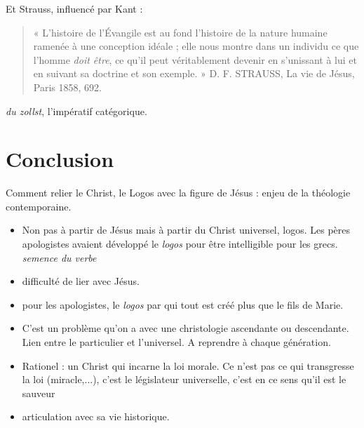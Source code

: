 Et Strauss, influencé par Kant : 
\begin{quote}
« L’histoire de l’Évangile est au fond l’histoire de la nature humaine ramenée à une
conception idéale ; elle nous montre dans un individu ce que l’homme \textit{doit être}, ce qu’il peut
véritablement devenir en s’unissant à lui et en suivant sa doctrine et son exemple. » D. F.
STRAUSS, La vie de Jésus, Paris 1858, 692.
    
\end{quote}
\textit{du zollst}, l'impératif catégorique. 







\section{Conclusion}

Comment relier le Christ, le Logos avec la figure de Jésus : enjeu de la théologie contemporaine.


\begin{Synthesis}
    \begin{itemize}
        \item Non pas à partir de Jésus mais à partir du Christ universel, logos. Les pères apologistes avaient développé le \textit{logos} pour être intelligible pour les grecs. \textit{semence du verbe}
        \item difficulté de lier avec Jésus.
        \item pour les apologistes, le \textit{logos} par qui tout est créé plus que le fils de Marie.
        \item C'est un problème qu'on a avec une christologie ascendante ou descendante. Lien entre le particulier et l'universel. A reprendre à chaque génération.
    \end{itemize}
    
\end{Synthesis}

\begin{Synthesis}
    \begin{itemize}
        \item Rationel : un Christ qui incarne la loi morale. Ce n'est pas ce qui transgresse la loi (miracle,...), c'est le législateur universelle, c'est en ce sens qu'il est le sauveur
        \item articulation avec sa vie historique.
    \end{itemize}
\end{Synthesis}
 
















 
